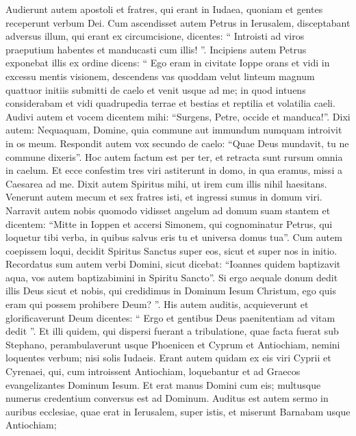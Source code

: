 \begin{biblechapter}
\begin{biblechapter}
\begin{biblechapter}
\begin{biblechapter}
\begin{biblechapter}
\begin{biblechapter}
\begin{biblechapter}
\begin{biblechapter}
\begin{biblechapter}
\begin{biblechapter}
\begin{biblechapter}
\verse Audierunt autem apostoli et fratres, qui erant in Iudaea, quoniam et gentes receperunt verbum Dei. 
\verse Cum ascendisset autem Petrus in Ierusalem, disceptabant adversus illum, qui erant ex circumcisione, 
\verse dicentes: “ Introisti ad viros praeputium habentes et manducasti cum illis! ”.
 \verse Incipiens autem Petrus exponebat illis ex ordine dicens: 
\verse “ Ego eram in civitate Ioppe orans et vidi in excessu mentis visionem, descendens vas quoddam velut linteum magnum quattuor initiis submitti de caelo et venit usque ad me; 
 \verse in quod intuens considerabam et vidi quadrupedia terrae et bestias et reptilia et volatilia caeli. 
\verse Audivi autem et vocem dicentem mihi: “Surgens, Petre, occide et manduca!”. 
\verse Dixi autem: Nequaquam, Domine, quia commune aut immundum numquam introivit in os meum. 
\verse Respondit autem vox secundo de caelo: “Quae Deus mundavit, tu ne commune dixeris”. 
\verse Hoc autem factum est per ter, et retracta sunt rursum omnia in caelum. 
\verse Et ecce confestim tres viri astiterunt in domo, in qua eramus, missi a Caesarea ad me. 
\verse Dixit autem Spiritus mihi, ut irem cum illis nihil haesitans. Venerunt autem mecum et sex fratres isti, et ingressi sumus in domum viri. 
\verse Narravit autem nobis quomodo vidisset angelum ad domum suam stantem et dicentem: “Mitte in Ioppen et accersi Simonem, qui cognominatur Petrus, 
\verse qui loquetur tibi verba, in quibus salvus eris tu et universa domus tua”. 
\verse Cum autem coepissem loqui, decidit Spiritus Sanctus super eos, sicut et super nos in initio. 
\verse Recordatus sum autem verbi Domini, sicut dicebat: “Ioannes quidem baptizavit aqua, vos autem baptizabimini in Spiritu Sancto”. 
\verse Si ergo aequale donum dedit illis Deus sicut et nobis, qui credidimus in Dominum Iesum Christum, ego quis eram qui possem prohibere Deum? ”.
 \verse His autem auditis, acquieverunt et glorificaverunt Deum dicentes: “ Ergo et gentibus Deus paenitentiam ad vitam dedit ”.
 \verse Et illi quidem, qui dispersi fuerant a tribulatione, quae facta fuerat sub Stephano, perambulaverunt usque Phoenicen et Cyprum et Antiochiam, nemini loquentes verbum; nisi solis Iudaeis. 
\verse Erant autem quidam ex eis viri Cyprii et Cyrenaei, qui, cum introissent Antiochiam, loquebantur et ad Graecos evangelizantes Dominum Iesum. 
\verse Et erat manus Domini cum eis; multusque numerus credentium conversus est ad Dominum.
 \verse Auditus est autem sermo in auribus ecclesiae, quae erat in Ierusalem, super istis, et miserunt Barnabam usque Antiochiam; 

\end{biblechapter}
\end{biblechapter}
\end{biblechapter}
\end{biblechapter}
\end{biblechapter}
\end{biblechapter}
\end{biblechapter}
\end{biblechapter}
\end{biblechapter}
\end{biblechapter}
\end{biblechapter}
